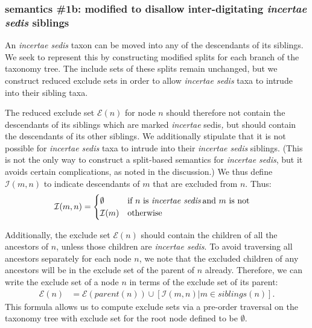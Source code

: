 \documentclass[english]{article}
\begin{document}
\subsubsection{semantics \#1b: modified to disallow inter-digitating
\emph{incertae sedis} siblings}

An \emph{incertae sedis} taxon can be moved into any of the
descendants of its siblings.
We seek to represent this by constructing
modified splits for each branch of the taxonomy tree.
The include sets
of these splits remain unchanged, but we construct reduced exclude
sets in order to allow \emph{incertae sedis} taxa to intrude into
their sibling taxa.

The reduced exclude set $\mathcal{E}(n)$ for node $n$ should therefore
not contain the descendants of its siblings which are marked
\emph{incertae }sedis\emph{,} but should contain the descendants of
its other siblings\emph{.
}We additionally stipulate that it is not
possible for \emph{incertae sedis} taxa to intrude into their
\emph{incertae sedis} siblings.
(This is not the only way to construct
a split-based semantics for \emph{incertae sedis}, but it avoids
certain complications, as noted in the discussion.) We thus define
$\mathcal{I}(m,n)$ to indicate descendants of $m$ that are excluded
from $n$.
Thus:
\begin{align*}
\mathcal{I}(m,n) & =
    \begin{cases}
        \emptyset & \text{if }n\text{ is \emph{incertae sedis}\,and }m\text{
is not}\\
        \mathcal{I}(m) & \text{otherwise}
    \end{cases}
\end{align*}

Additionally, the exclude set $\mathcal{E}(n)$ should contain the children of
all the ancestors of $n$, unless those children are \emph{incertae sedis}.
To avoid traversing all ancestors separately for each node $n$, we note that the
excluded children of any ancestors will be in the exclude set of the parent of
$n$ already. Therefore, we can write the exclude set of a node $n$ in terms of
the exclude set of its parent:
\begin{align}
    \mathcal{E}(n) & = \mathcal{E}(parent(n))\cup\left[\mathcal{I}(m,n)\big|m\in
           siblings(n)\right].\label{eq:exclude-set-formula-1}
\end{align}
This formula allows us to compute exclude sets via a pre-order traversal on the
taxonomy tree with exclude set for the root node defined to be $\emptyset$.
\end{document}
